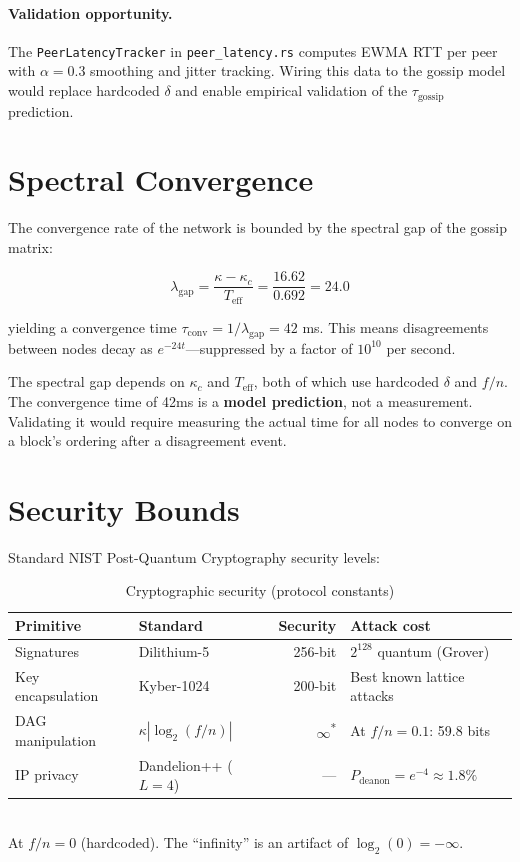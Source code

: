 \documentclass[11pt,a4paper]{article}
\begin{document}
\paragraph{Validation opportunity.} The \texttt{PeerLatencyTracker} in \texttt{peer\_latency.rs} computes EWMA RTT per peer with $\alpha = 0.3$ smoothing and jitter tracking. Wiring this data to the gossip model would replace hardcoded $\delta$ and enable empirical validation of the $\tau_{\text{gossip}}$ prediction.

\section{Spectral Convergence}

The convergence rate of the network is bounded by the spectral gap of the gossip matrix:

\begin{equation}
\lambda_{\text{gap}} = \frac{\kappa - \kappa_c}{T_{\text{eff}}} = \frac{16.62}{0.692} = 24.0
\end{equation}

yielding a convergence time $\tau_{\text{conv}} = 1/\lambda_{\text{gap}} = 42$ ms. This means disagreements between nodes decay as $e^{-24t}$---suppressed by a factor of $10^{10}$ per second.

\begin{honesty}
The spectral gap depends on $\kappa_c$ and $T_{\text{eff}}$, both of which use hardcoded $\delta$ and $f/n$. The convergence time of 42ms is a \textbf{model prediction}, not a measurement. Validating it would require measuring the actual time for all nodes to converge on a block's ordering after a disagreement event.
\end{honesty}

\section{Security Bounds}

Standard NIST Post-Quantum Cryptography security levels:

\begin{table}[H]
\centering
\caption{Cryptographic security (\textcolor{sectionblue}{protocol constants})}
\begin{tabular}{@{}llrl@{}}
\toprule
\textbf{Primitive} & \textbf{Standard} & \textbf{Security} & \textbf{Attack cost} \\
\midrule
Signatures & Dilithium-5 & 256-bit & $2^{128}$ quantum (Grover) \\
Key encapsulation & Kyber-1024 & 200-bit & Best known lattice attacks \\
DAG manipulation & $\kappa|\log_2(f/n)|$ & $\infty$\textsuperscript{*} & At $f/n = 0.1$: 59.8 bits \\
IP privacy & Dandelion++ ($L=4$) & --- & $P_{\text{deanon}} = e^{-4} \approx 1.8\%$ \\
\bottomrule
\end{tabular}
\\[2pt]
{\footnotesize *At $f/n = 0$ (hardcoded). The ``infinity'' is an artifact of $\log_2(0) = -\infty$.}
\end{table}
\end{document}
